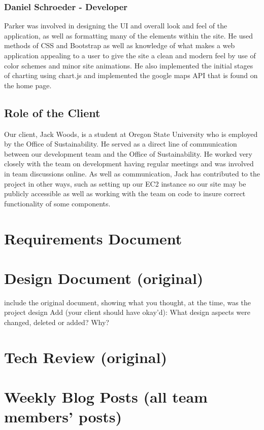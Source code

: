 \documentclass[journal,10pt,onecolumn,compsoc]{IEEEtran}
\begin{document}
	\subsubsection{Daniel Schroeder - Developer}
	Parker was involved in designing the UI and overall look and feel of the application, as well as formatting many of the elements within the site. He used methods of CSS and Bootstrap as well as knowledge of what makes a web application appealing to a user to give the site a clean and modern feel by use of color schemes and minor site animations. He also implemented the initial stages of charting using chart.js and implemented the google maps API that is found on the home page. 
	\subsection{Role of the Client}
	Our client, Jack Woods, is a student at Oregon State University who is employed by the Office of Sustainability. He served as a direct line of communication between our development team and the Office of Sustainability. He worked very closely with the team on development having regular meetings and was involved in team discussions online. As well as communication, Jack has contributed to the project in other ways, such as setting up our EC2 instance so our site may be publicly accessible as well as working with the team on code to insure correct functionality of some components.
	
    \section{Requirements Document}
    
    
    \section{Design Document (original)}
    
    include the original document, showing what you thought, at the time, was the project design
    Add (your client should have okay'd): What design aspects were changed, deleted or added? Why? 
    \section{Tech Review (original)}
    
	
    \section{Weekly Blog Posts (all team members' posts)}
\end{document}
